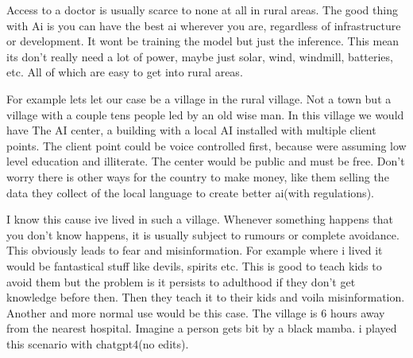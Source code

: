 Access to a doctor is usually scarce to none at all in rural areas. The good thing with Ai is you can have the best ai wherever you are, regardless of infrastructure or development. It wont be training the model but just the inference. This mean its don't really need a lot of power, maybe just solar, wind, windmill, batteries, etc. All of which are easy to get into rural areas.

For example lets let our case be a village in the rural village. Not a town but a village with a couple tens people led by an old wise man. In this village we would have The AI center, a building with a local AI installed with multiple client points. The client point could be voice controlled first, because were assuming low level education and illiterate. The center would be public and must be free. Don't worry there is other ways for the country to make money, like them selling the data they collect of the local language to create better ai(with regulations). 

I know this cause ive lived in such a village. Whenever something happens that you don't know happens, it is usually subject to rumours or complete avoidance. This obviously leads to fear and misinformation. For example where i lived it would be fantastical stuff like devils, spirits etc. This is good to teach kids to avoid them but the problem is it persists to adulthood if they don't get knowledge before then. Then they teach it to their kids and voila misinformation.
Another and more normal use would be this case. The village is 6 hours away from the nearest hospital. Imagine a person gets bit by a black mamba. i played this scenario with chatgpt4(no edits).


